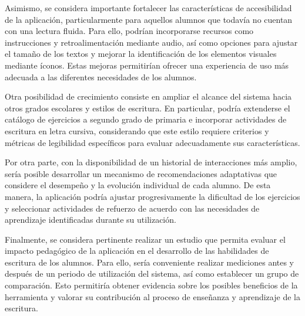 Asimismo, se considera importante fortalecer las características de accesibilidad de la aplicación, particularmente para aquellos alumnos que todavía no cuentan con una lectura fluida. Para ello, podrían incorporarse recursos como instrucciones y retroalimentación mediante audio, así como opciones para ajustar el tamaño de los textos y mejorar la identificación de los elementos visuales mediante íconos. Estas mejoras permitirían ofrecer una experiencia de uso más adecuada a las diferentes necesidades de los alumnos.

Otra posibilidad de crecimiento consiste en ampliar el alcance del sistema hacia otros grados escolares y estilos de escritura. En particular, podría extenderse el catálogo de ejercicios a segundo grado de primaria e incorporar actividades de escritura en letra cursiva, considerando que este estilo requiere criterios y métricas de legibilidad específicos para evaluar adecuadamente sus características.

Por otra parte, con la disponibilidad de un historial de interacciones más amplio, sería posible desarrollar un mecanismo de recomendaciones adaptativas que considere el desempeño y la evolución individual de cada alumno. De esta manera, la aplicación podría ajustar progresivamente la dificultad de los ejercicios y seleccionar actividades de refuerzo de acuerdo con las necesidades de aprendizaje identificadas durante su utilización.

Finalmente, se considera pertinente realizar un estudio que permita evaluar el impacto pedagógico de la aplicación en el desarrollo de las habilidades de escritura de los alumnos. Para ello, sería conveniente realizar mediciones antes y después de un periodo de utilización del sistema, así como establecer un grupo de comparación. Esto permitiría obtener evidencia sobre los posibles beneficios de la herramienta y valorar su contribución al proceso de enseñanza y aprendizaje de la escritura.

